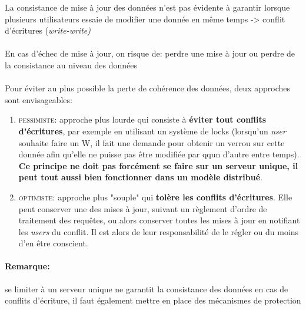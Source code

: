 \item{}
{\faux}
{
La consistance de mise à jour des données n'est pas évidente à garantir lorsque plusieurs utilisateurs essaie de modifier une donnée en même temps -> conflit d'écritures (\textit{write-write)}

\paragraph{}
En cas d'échec de mise à jour, on risque de: perdre une mise à jour ou perdre de la consistance au niveau des données
\paragraph{}

Pour éviter au plus possible la perte de cohérence des données, deux approches sont envisageables:
\begin{enumerate}
\item \textcolor{ltred}{\textsc{pessimiste}}: approche plus lourde qui consiste à \textbf{éviter tout conflits d'écritures}, par exemple en utilisant un système de locks (lorsqu'un \textit{user} souhaite faire un W, il fait une demande pour obtenir un verrou sur cette donnée afin qu'elle ne puisse pas être modifiée par qqun d'autre entre temps). \textbf{Ce principe ne doit pas forcément se faire sur un serveur unique, il peut tout aussi bien fonctionner dans un modèle distribué}.
\item \textcolor{ltred}{\textsc{optimiste}}: approche plus "souple" qui \textbf{tolère les conflits d'écritures}. Elle peut conserver une des mises à jour, suivant un règlement d'ordre de traitement des requêtes, ou alors conserver toutes les mises à jour en notifiant les \textit{users} du conflit. Il est alors de leur responsabilité de le régler ou du moins d'en être conscient.
\end{enumerate}

\paragraph{Remarque: }
se limiter à un serveur unique ne garantit la consistance des données en cas de conflits d'écriture, il faut également mettre en place des mécanismes de protection
}


